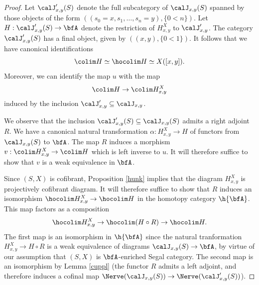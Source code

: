 \begin{proof}
Let $\calJ'_{x,y}(S)$ denote the full subcategory of $\calJ_{x,y}(S)$ spanned by those objects of the form
$( (s_0 = x, s_1, \ldots, s_n = y), \{ 0 < n \} )$. Let $H: \calJ'_{x,y}(S) \rightarrow \bfA$ denote the restriction of $H^{X}_{x,y}$ to $\calJ'_{x,y}$. The category $\calJ'_{x,y}(S)$ has a final object, given by
$( (x,y), \{0 < 1\} )$. It follows that we have canonical identifications
$$ \colim H \simeq \hocolim H \simeq X( [x,y] ).$$
Moreover, we can identify the map $u$ with the map
$$\colim H \rightarrow \colim H^{X}_{x,y}$$
induced by the inclusion $\calJ'_{x,y} \subseteq \calJ_{x,y}$. 

We observe that the inclusion $\calJ'_{x,y}(S) \subseteq \calJ_{x,y}(S)$ admits a right adjoint $R$. We have a canonical natural transformation $\alpha: H^X_{x,y} \rightarrow H$ of functors
from $\calJ_{x,y}(S)$ to $\bfA$. The map $R$ induces a morphism
$v: \colim H^{X}_{x,y} \rightarrow \colim H$ which is left inverse to $u$. It will therefore suffice
to show that $v$ is a weak equivalence in $\bfA$. 

Since $(S,X)$ is cofibrant, Proposition \ref{hunk} implies that the diagram $H^{X}_{x,y}$ is projectively cofibrant diagram. It will therefore suffice to show that $R$ induces an
isomorphism $\hocolim H^{X}_{x,y} \rightarrow \hocolim H$ in the homotopy category $\h{\bfA}$.
This map factors as a composition
$$ \hocolim H^{X}_{x,y} \rightarrow \hocolim (H \circ R) \rightarrow \hocolim H.$$
The first map is an isomorphism in $\h{\bfA}$ since the natural tranformation $H^{X}_{x,y} \rightarrow H \circ R$ is a weak equivalence of diagrams $\calJ_{x,y}(S) \rightarrow \bfA$, by virtue of our assumption
that $(S,X)$ is $\bfA$-enriched Segal category. The second map is an isomorphism by Lemma \ref{cuppl}
(the functor $R$ admits a left adjoint, and therefore induces a cofinal map $\Nerve( \calJ_{x,y}(S) ) \rightarrow \Nerve( \calJ'_{x,y}(S) )$).
\end{proof}

